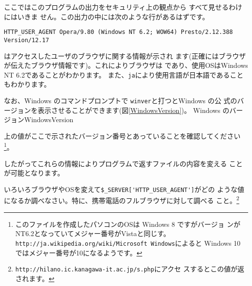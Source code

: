 ここではこのプログラムの出力をセキュリティ上の観点から
すべて見せるわけにはいきま
せん。この出力の中には次のような行があるはずです。
\begin{verbatim}
HTTP_USER_AGENT	Opera/9.80 (Windows NT 6.2; WOW64) Presto/2.12.388 Version/12.17
\end{verbatim}
はアクセスしたユーザのブラウザに関する情報が示され
ます(正確にはブラウザが伝えたブラウザ情報です)。これによりブラウザは
\Operan であり、使用OSはWindows NT 6.2であることがわかります。
また、\texttt{ja}により使用言語が日本語であることもわかります。

なお、Windows のコマンドプロンプトで \texttt{winver}と打つとWindows の公
式のバージョンを表示させることができます(図\ref{WindowsVersion})。
%
{Windows のバージョン}{WindowsVersion}

上の値がここで示されたバージョン番号とあっていることを確認してください
\footnote{このファイルを作成したパソコンのOSは Windows 8 ですがバージョ
ンがNT6.2となっていてメジャー番号がVistaと同じす。
\texttt{http://ja.wikipedia.org/wiki/Microsoft\textunderscore
Windows}によると Windows
10 ではメジャー番号が10になるようです。}。

したがってこれらの情報によりプログラムで返すファイルの内容を変える
ことが可能となります。
\begin{Problem}\upshape
 いろいろブラウザやOSを変えて\verb+$_SERVER['HTTP_USER_AGENT']+がどの
 ような値になるか調べなさい。特に、携帯電話のフルブラウザに対して調べる
 こと。\footnote{\texttt{http://hilano.ic.kanagawa-it.ac.jp/s.php}にアクセ
 スするとこの値が返されます。}
\end{Problem}
